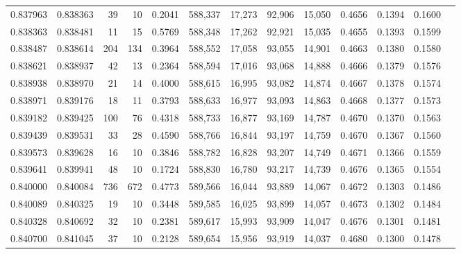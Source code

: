 \begin{tabular}{rrrrrrrrrrrrr}
0.837963 & 0.838363 &    39 &  10 &                                     0.2041 & 588,337 &  17,273 &  92,906 &  15,050 & 0.4656 & 0.1394 & 0.1600 \\
0.838363 & 0.838481 &    11 &  15 &                                     0.5769 & 588,348 &  17,262 &  92,921 &  15,035 & 0.4655 & 0.1393 & 0.1599 \\
0.838487 & 0.838614 &   204 & 134 &                                     0.3964 & 588,552 &  17,058 &  93,055 &  14,901 & 0.4663 & 0.1380 & 0.1580 \\
0.838621 & 0.838937 &    42 &  13 &                                     0.2364 & 588,594 &  17,016 &  93,068 &  14,888 & 0.4666 & 0.1379 & 0.1576 \\
0.838938 & 0.838970 &    21 &  14 &                                     0.4000 & 588,615 &  16,995 &  93,082 &  14,874 & 0.4667 & 0.1378 & 0.1574 \\
0.838971 & 0.839176 &    18 &  11 &                                     0.3793 & 588,633 &  16,977 &  93,093 &  14,863 & 0.4668 & 0.1377 & 0.1573 \\
0.839182 & 0.839425 &   100 &  76 &                                     0.4318 & 588,733 &  16,877 &  93,169 &  14,787 & 0.4670 & 0.1370 & 0.1563 \\
0.839439 & 0.839531 &    33 &  28 &                                     0.4590 & 588,766 &  16,844 &  93,197 &  14,759 & 0.4670 & 0.1367 & 0.1560 \\
0.839573 & 0.839628 &    16 &  10 &                                     0.3846 & 588,782 &  16,828 &  93,207 &  14,749 & 0.4671 & 0.1366 & 0.1559 \\
0.839641 & 0.839941 &    48 &  10 &                                     0.1724 & 588,830 &  16,780 &  93,217 &  14,739 & 0.4676 & 0.1365 & 0.1554 \\
0.840000 & 0.840084 &   736 & 672 &                                     0.4773 & 589,566 &  16,044 &  93,889 &  14,067 & 0.4672 & 0.1303 & 0.1486 \\
0.840089 & 0.840325 &    19 &  10 &                                     0.3448 & 589,585 &  16,025 &  93,899 &  14,057 & 0.4673 & 0.1302 & 0.1484 \\
0.840328 & 0.840692 &    32 &  10 &                                     0.2381 & 589,617 &  15,993 &  93,909 &  14,047 & 0.4676 & 0.1301 & 0.1481 \\
0.840700 & 0.841045 &    37 &  10 &                                     0.2128 & 589,654 &  15,956 &  93,919 &  14,037 & 0.4680 & 0.1300 & 0.1478 \\

\end{tabular}
